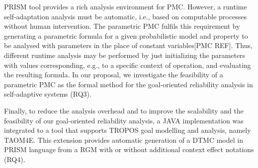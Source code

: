 PRISM tool provides a rich analysis environment for PMC. However, a runtime self-adaptation analysis must be automatic, i.e., based on computable processes without human intervention. The parametric PMC fulfils this requirement by generating a parametric formula for a given probabilistic model and property to be analysed with parameters in the place of constant variables[PMC REF]. Thus, different runtime analysis may be performed by just initializing the parameters with values corresponding, e.g., to a specific context of operation, and evaluating the resulting formula. In our proposal, we investigate the feasibility of a parametric PMC as the formal method for the goal-oriented reliability analysis in self-adaptive systems (RQ3).

Finally, to reduce the analysis overhead and to improve the scalability and the feasibility of our goal-oriented reliability analysis, a JAVA implementation was integrated to a tool that supports TROPOS goal modelling and analysis, namely TAOM4E. This extension provides automatic generation of a DTMC model in PRISM language from a RGM with or without additional context effect notations (RQ4).








